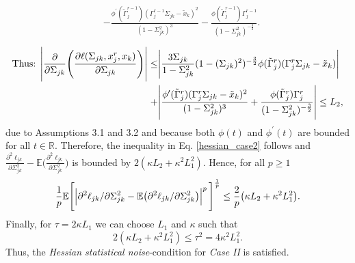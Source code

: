 \begin{condition}
\begin{multline}
\begin{aligned}
            &-  \frac{\phi^\prime({\tilde{\Gamma}}_j^{r-1})({\Gamma}_j^{r-1}\Sigma_{jk} - {\tilde{x}}_{k})^2}{(1-\Sigma_{jk}^2)^3} - \frac{\phi({\tilde{\Gamma}}_j^{r-1}){\Gamma}_j^{r-1}}{(1-\Sigma_{jk}^2)^{-\frac{3}{2}}}.
            \end{aligned}
    \end{multline}
    \begin{equation*}
        \begin{split}
            \text{Thus: } \abs{\frac{\partial}{\partial \Sigma_{jk}} \Bigg(\frac{\partial\ell(\Sigma_{jk}, x_j^r,x_k)}{\partial \Sigma_{jk}}\Bigg)} \leq &\abs{\frac{3\Sigma_{jk}}{1-\Sigma_{jk}^2} (1-(\Sigma_{jk})^2)^{-\frac{3}{2}} \phi({\tilde{\Gamma}}_j^{r})({\Gamma}_j^r\Sigma_{jk} - {\tilde{x}}_{k})} \\
            + &\abs{\frac{\phi^\prime({\tilde{\Gamma}}_j^{r})({\Gamma}_j^r\Sigma_{jk} - {\tilde{x}}_{k})^2}{(1-\Sigma_{jk}^2)^3} + \frac{\phi({\tilde{\Gamma}}_j^{r}){\Gamma}_j^{r}}{(1-\Sigma_{jk}^2)^{-\frac{3}{2}}}} \leq L_2,
        \end{split}
    \end{equation*}
    due to Assumptions 3.1 and 3.2 %
    and because both $\phi(t)$ and $\phi^{\prime}(t)$ are bounded for all $t\in\mathbb{R}$. Therefore, the inequality in Eq. \eqref{hessian_case2} follows and $\frac{\partial^2\ell_{jk}}{\partial \Sigma_{jk}^{2}} - \mathbb{E}\bigg(\frac{\partial^2\ell_{jk}}{\partial \Sigma_{jk}^{2}}\bigg)$ is bounded by $2(\kappa L_2 + \kappa^2 L_1^2)$. Hence, for all $p\geq1$
    \begin{equation}
        \frac{1}{p}\mathbb{E}\Bigg[\abs{\partial^2\ell_{jk}/\partial \Sigma_{jk}^{2} - \mathbb{E}\big(\partial^2\ell_{jk}/\partial \Sigma_{jk}^{2}\big)}^p\Bigg]^{\frac{1}{p}} \leq \frac{2}{p}\big(\kappa L_2 + \kappa^2 L_1^2\big).
    \end{equation}
    Finally, for $\tau = 2\kappa L_1$ we can choose $L_1$ and $\kappa$ such that \[2(\kappa L_2 + \kappa^2 L_1^2) \leq \tau^2 = 4\kappa^2 L_1^2.\] Thus, the \textit{Hessian statistical noise}-condition for \textit{Case II} is satisfied.


\end{condition}
